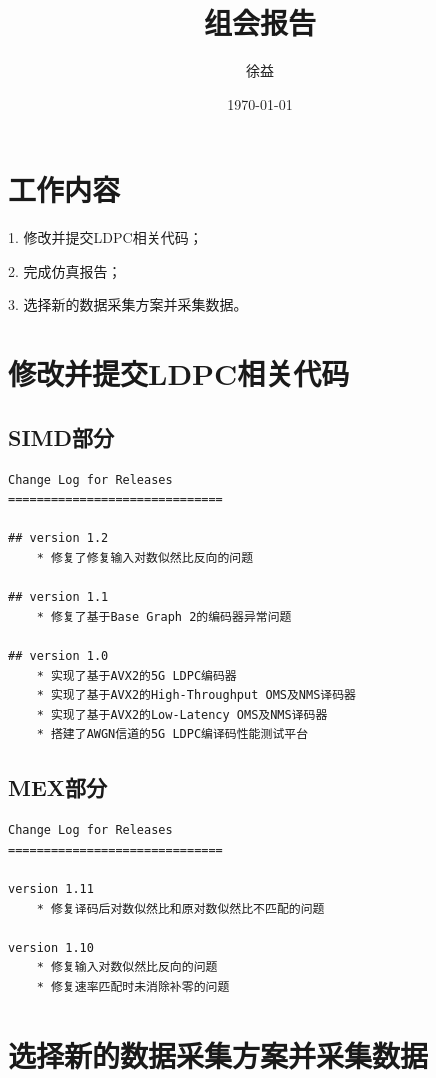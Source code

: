 \documentclass{article}
\title{组会报告}
\author{徐益}
\date{\today}
\begin{document}
\maketitle


\section{工作内容}
1. 修改并提交LDPC相关代码；

2. 完成仿真报告；

3. 选择新的数据采集方案并采集数据。

\section{修改并提交LDPC相关代码}
\subsection{SIMD部分}
\begin{lstlisting}
Change Log for Releases
==============================

## version 1.2
    * 修复了修复输入对数似然比反向的问题

## version 1.1
    * 修复了基于Base Graph 2的编码器异常问题

## version 1.0
    * 实现了基于AVX2的5G LDPC编码器
    * 实现了基于AVX2的High-Throughput OMS及NMS译码器
    * 实现了基于AVX2的Low-Latency OMS及NMS译码器
    * 搭建了AWGN信道的5G LDPC编译码性能测试平台
\end{lstlisting}
\subsection{MEX部分}
\begin{lstlisting}
Change Log for Releases
==============================

version 1.11
    * 修复译码后对数似然比和原对数似然比不匹配的问题

version 1.10
    * 修复输入对数似然比反向的问题
    * 修复速率匹配时未消除补零的问题
\end{lstlisting}

\section{选择新的数据采集方案并采集数据}
\end{document}
